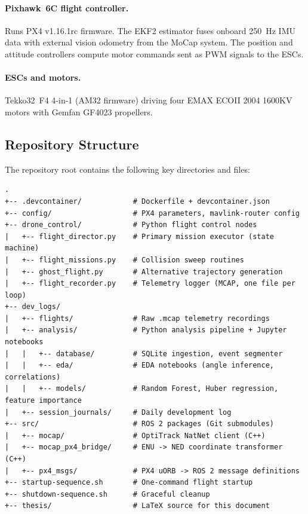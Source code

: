 \paragraph{Pixhawk~6C flight controller.} Runs PX4 v1.16.1rc firmware. The EKF2 estimator fuses onboard 250~Hz IMU data with external vision odometry from the MoCap system. The position and attitude controllers compute motor commands sent as PWM signals to the ESCs.

\paragraph{ESCs and motors.} Tekko32~F4 4-in-1 (AM32 firmware) driving four EMAX ECOII 2004 1600KV motors with Gemfan GF4023 propellers.

\subsection{Repository Structure}

The repository root contains the following key directories and files:

\begin{lstlisting}[basicstyle=\ttfamily\footnotesize,numbers=none]
.
+-- .devcontainer/            # Dockerfile + devcontainer.json
+-- config/                   # PX4 parameters, mavlink-router config
+-- drone_control/            # Python flight control nodes
|   +-- flight_director.py    # Primary mission executor (state machine)
|   +-- flight_missions.py    # Collision sweep routines
|   +-- ghost_flight.py       # Alternative trajectory generation
|   +-- flight_recorder.py    # Telemetry logger (MCAP, one file per loop)
+-- dev_logs/
|   +-- flights/              # Raw .mcap telemetry recordings
|   +-- analysis/             # Python analysis pipeline + Jupyter notebooks
|   |   +-- database/         # SQLite ingestion, event segmenter
|   |   +-- eda/              # EDA notebooks (angle inference, correlations)
|   |   +-- models/           # Random Forest, Huber regression, feature importance
|   +-- session_journals/     # Daily development log
+-- src/                      # ROS 2 packages (Git submodules)
|   +-- mocap/                # OptiTrack NatNet client (C++)
|   +-- mocap_px4_bridge/     # ENU -> NED coordinate transformer (C++)
|   +-- px4_msgs/             # PX4 uORB -> ROS 2 message definitions
+-- startup-sequence.sh       # One-command flight startup
+-- shutdown-sequence.sh      # Graceful cleanup
+-- thesis/                   # LaTeX source for this document
\end{lstlisting}

